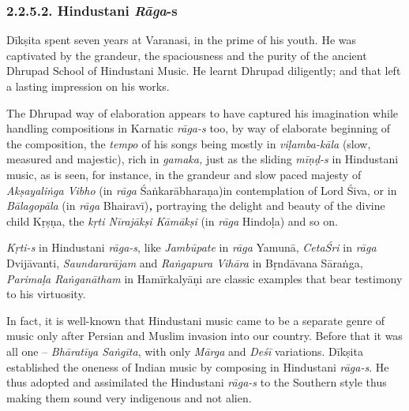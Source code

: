 \vspace{-.2cm}

\subsubsection*{2.2.5.2. Hindustani \textit{Rāga}-s}

\vspace{-.2cm}

Dīkṣita spent seven years at Varanasi, in the prime of his youth. He was captivated by the grandeur, the spaciousness and the purity of the ancient Dhrupad School of Hindustani Music. He learnt Dhrupad diligently; and that left a lasting impression on his works.

The Dhrupad way of elaboration appears to have captured his imagination while handling compositions in Karnatic \textit{rāga-s} too, by way of elaborate beginning of the composition, the \textit{tempo} of his songs being mostly in \textit{viḷamba-kāla} (slow, measured and majestic), rich in \textit{gamaka,} just as the sliding \textit{mīṇḍ-s} in Hindustani music, as is seen, for instance, in the grandeur and slow paced majesty of \textit{Akṣayaliṅga Vibho} (in \textit{rāga} Śaṅkarābharaṇa)in contemplation of Lord Śiva, or in \textit{Bālagopāla} (in \textit{rāga} Bhairavī)\textit{\textbf{, }}portraying the delight and beauty of the divine child Kṛṣṇa, the \textit{kṛti Nīrajākṣi Kāmākṣi} (in \textit{rāga} Hindoḷa) and so on.


\textit{Kṛti-s} in Hindustani \textit{rāga-s}, like \textit{Jambūpate} in \textit{rāga} Yamunā, \textit{CetaŚri} in \textit{rāga} Dvijāvanti, \textit{Saundararājam} and \textit{Raṅgapura Vihāra} in Bṛndāvana Sāraṅga, \textit{Parimaḷa Raṅganātham} in Hamīrkalyāṇi are classic examples that bear testimony to his virtuosity.

In fact, it is well-known that Hindustani music came to be a separate genre of music only after Persian and Muslim invasion into our country. Before that it was all one – \textit{Bhāratīya Saṅgīta}, with only \textit{Mārga} and \textit{Deśī} variations. Dīkṣita established the oneness of Indian music by composing in Hindustani \textit{rāga-s}. He thus adopted and assimilated the Hindustani \textit{rāga-s} to the Southern style thus making them sound very indigenous and not alien.

